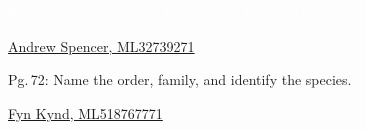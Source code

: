 \documentclass[t]{beamer}
\begin{document}
{
	\begin{frame}[t]{\textcolor{white}{Pg.\,128: Name the order, family, and identify the species.}}
		
		\tinyfill  \textcolor{white}{\href{https://macaulaylibrary.org/asset/32739271}{Andrew Spencer, ML32739271}}
	\end{frame}
}


{
	\begin{frame}[t]{Pg.\,72: Name the order, family, and identify the species.}
		
		\tinyfill  \textcolor{white}{\href{https://macaulaylibrary.org/asset/518767771}{Fyn Kynd, ML518767771}}
	\end{frame}
}
\end{document}
